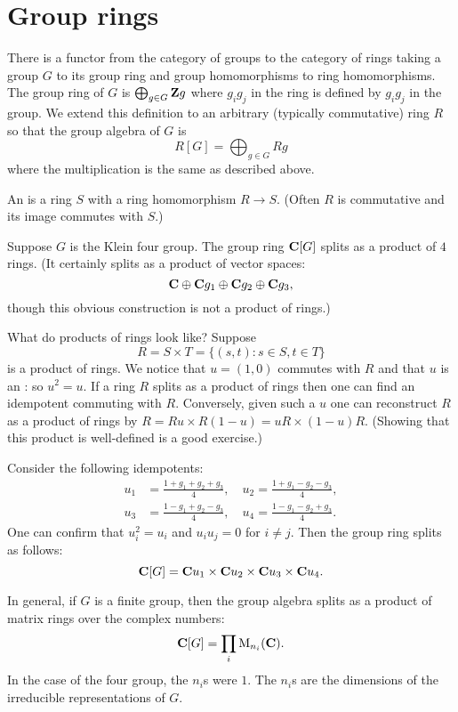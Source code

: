 \documentclass[11pt, oneside,margin=1in]{article}
\begin{document}
\section{Group rings}
There is a functor from the category of groups to the category of rings taking a group $G$ to its group ring and group homomorphisms to ring homomorphisms. The group ring of $G$ is $\bigoplus _{g\in G} \mathbf Z g$ where $g_ig_j$ in the ring is defined by $g_ig_j$ in the group. We extend this definition to an arbitrary (typically commutative) ring $R$ so that the group algebra of $G$ is
$$
R[G] = \bigoplus_{g\in G} Rg
$$
where the multiplication is the same as described above.

\begin{definition}[ ]\label{}
An  is a ring $S$ with a ring homomorphism $R\longrightarrow S$. (Often $R$ is commutative and its image commutes with $S$.) \iffalse$S_{}$\fi
\end{definition}

Suppose $G$ is the Klein four group. The group ring $\mathbf C[G]$ splits as a product of $4$ rings. (It certainly splits as a product of vector spaces: 
$$
\mathbf C \oplus \mathbf C g_1 \oplus \mathbf C g_2\oplus \mathbf C g_3,
$$ 
though this obvious construction is not a product of rings.) 

What do products of rings look like? Suppose 
$$
R = S\times T = \{ (s,t) : s\in S,t\in T\}
$$
is a product of rings. We notice that $u = (1,0)$ commutes with $R$ and that $u$ is an : so $u^2 = u$. If a ring $R$ splits as a product of rings then one can find an idempotent commuting with $R$. Conversely, given such a $u$ one can reconstruct $R$ as a product of rings by $R = Ru \times R(1-u) = uR \times (1-u)R$. (Showing that this product is well-defined is a good exercise.)

Consider the following idempotents:
\begin{align*}
u_1 &= \frac{1 +g_1+g_2+g_3}{4},\quad
u_2 = \frac{1 +g_1-g_2-g_3}{4},\\
u_3 &= \frac{1 -g_1+g_2-g_3}{4},\quad
u_4 = \frac{1 -g_1-g_2+g_3}{4}.
\end{align*}
One can confirm that $u_i^2 = u_i$ and $u_iu_j=0$ for $i\ne j  $. Then the group ring splits as follows:
$$
\mathbf C[G] = \mathbf C u_1 \times \mathbf C u_2 \times \mathbf C u_3 \times \mathbf C u_4.
$$

In general, if $G$ is a finite group, then the group algebra splits as a product of matrix rings over the complex numbers:
$$
\mathbf C[G] = \prod_i \operatorname{M}_{n_i} (\mathbf C).
$$
In the case of the four group, the $n_i$s were $1$. The $n_i$s are the dimensions of the irreducible representations of $G$.
\end{document}
